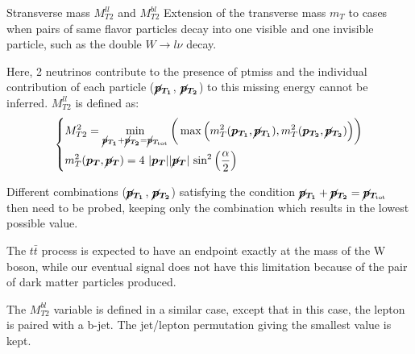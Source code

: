 \documentclass[8pt]{beamer}
\begin{document}
\begin{frame}{Stransverse mass $M_{T2}^{ll}$ and $M_{T2}^{bl}$}
\justifying
Extension of the transverse mass $m_T$ to cases when pairs of same flavor particles decay into one visible and one invisible particle, such as the double $W \rightarrow l\nu$ decay. \vfill

Here, 2 neutrinos contribute to the presence of ptmiss and the individual contribution of each particle ($\bm{\cancel{p}_{T_{1}}}$, $\bm{\cancel{p}_{T_2}}$) to this missing energy cannot be inferred. $M_{T2}^{ll}$ is defined as:
\begin{equation*}
\begin{dcases}
M_{T2}^2 = \min_{\bm{\cancel{p}_{T_{1}}} + \bm{\cancel{p}_{T_{2}}} = \bm{\cancel{p}_{T_{\text{tot}}}}} \bigg (\max \Big (m_T^2(\bm{p_{T_1}}, \bm{\cancel{p}_{T_{1}}}), m_T^2(\bm{p_{T_2}}, \bm{\cancel{p}_{T_{2}}}) \Big ) \bigg ) \\
m_T^2(\bm{p_{T}}, \bm{\cancel{p}_{T}}) = 4 \text{ } |\bm{p_{T}}| |\bm{\cancel{p}_{T}}| \text{ sin}^2 \left (\frac{\alpha}{2} \right ) 
\end{dcases}
\end{equation*} \vfill

Different combinations ($\bm{\cancel{p}_{T_{1}}}$, $\bm{\cancel{p}_{T_{2}}}$) satisfying the condition $\bm{\cancel{p}_{T_{1}}} + \bm{\cancel{p}_{T_{2}}} = \bm{\cancel{p}_{T_{\text{tot}}}}$ then need to be probed, keeping only the combination which results in the lowest possible value. \vfill

The $t \bar t$ process is expected to have an endpoint exactly at the mass of the W boson, while our eventual signal does not have this limitation because of the pair of dark matter particles produced. \vfill

The $M_{T2}^{bl}$ variable is defined in a similar case, except that in this case, the lepton is paired with a b-jet. The jet/lepton permutation giving the smallest value is kept. \vfill
\end{frame}
\end{document}
